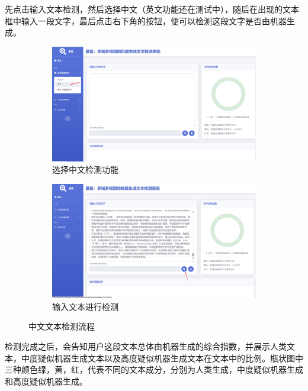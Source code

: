 \documentclass[a4paper]{report}
\begin{document}
先点击输入文本检测，然后选择中文（英文功能还在测试中），随后在出现的文本框中输入一段文字，最后点击右下角的按钮，便可以检测这段文字是否由机器生成。
\begin{figure}[H]
	\centering
	\begin{subfigure}[b]{0.45\textwidth}
		\centering
		\includegraphics[width=\textwidth]{figures/选择中文检测.png}
		\caption{选择中文检测功能}
		\label{选择中文检测功能}
	\end{subfigure}
	\begin{subfigure}[b]{0.47\textwidth}
		\centering
		\includegraphics[width=\textwidth]{figures/输入文本检测.png}
		\caption{输入文本进行检测}
		\label{输入文本进行检测}
	\end{subfigure}
	\caption{中文文本检测流程}
	\label{中文文本检测流程}
\end{figure}
检测完成之后，会告知用户这段文本总体由机器生成的综合指数，并展示人类文本，中度疑似机器生成文本以及高度疑似机器生成文本在文本中的比例。瓶状图中三种颜色绿，黄，红，代表不同的文本成分，分别为人类生成，中度疑似机器生成和高度疑似机器生成。
\end{document}
